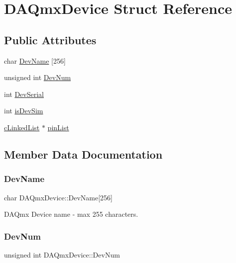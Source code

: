\hypertarget{struct_d_a_qmx_device}{}\section{D\+A\+Qmx\+Device Struct Reference}
\label{struct_d_a_qmx_device}
\subsection*{Public Attributes}
\begin{DoxyCompactItemize}
\item 
char \mbox{\hyperlink{struct_d_a_qmx_device_adba2c780d9ec282be39523bfe21f96a7}{Dev\+Name}} \mbox{[}256\mbox{]}
\item 
unsigned int \mbox{\hyperlink{struct_d_a_qmx_device_a297cf2f2e79d47e67353b553351e79aa}{Dev\+Num}}
\item 
int \mbox{\hyperlink{struct_d_a_qmx_device_af76a0d98a8b47eda2aba51fba33da147}{Dev\+Serial}}
\item 
int \mbox{\hyperlink{struct_d_a_qmx_device_a27c7b25db245ca2d5bf91c28ac37f08c}{is\+Dev\+Sim}}
\item 
\mbox{\hyperlink{structc_linked_list_t_a_g}{c\+Linked\+List}} $\ast$ \mbox{\hyperlink{struct_d_a_qmx_device_a23df66a3e413397d12503b0c06eddb21}{pin\+List}}
\end{DoxyCompactItemize}


\subsection{Member Data Documentation}
\mbox{\label{struct_d_a_qmx_device_adba2c780d9ec282be39523bfe21f96a7}} 
\subsubsection{\texorpdfstring{Dev\+Name}{DevName}}
{\footnotesize\ttfamily char D\+A\+Qmx\+Device\+::\+Dev\+Name\mbox{[}256\mbox{]}}

D\+A\+Qmx Device name -\/ max 255 characters. \mbox{\label{struct_d_a_qmx_device_a297cf2f2e79d47e67353b553351e79aa}} 
\subsubsection{\texorpdfstring{Dev\+Num}{DevNum}}
{\footnotesize\ttfamily unsigned int D\+A\+Qmx\+Device\+::\+Dev\+Num}

